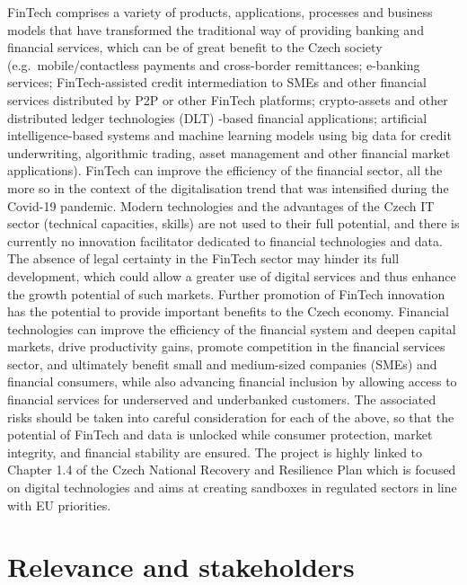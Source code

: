 \documentclass[
]{book}
\begin{document}
FinTech comprises a variety of products, applications, processes and business models that have transformed the traditional way of providing banking and financial services, which can be of great benefit to the Czech society (e.g.~mobile/contactless payments and cross-border remittances; e-banking services; FinTech-assisted credit intermediation to SMEs and other financial services distributed by P2P or other FinTech platforms; crypto-assets and other distributed ledger technologies (DLT) -based financial applications; artificial intelligence-based systems and machine learning models using big data for credit underwriting, algorithmic trading, asset management and other financial market applications).
FinTech can improve the efficiency of the financial sector, all the more so in the context of the digitalisation trend that was intensified during the Covid-19 pandemic. Modern technologies and the advantages of the Czech IT sector (technical capacities, skills) are not used to their full potential, and there is currently no innovation facilitator dedicated to financial technologies and data. The absence of legal certainty in the FinTech sector may hinder its full development, which could allow a greater use of digital services and thus enhance the growth potential of such markets.
Further promotion of FinTech innovation has the potential to provide important benefits to the Czech economy. Financial technologies can improve the efficiency of the financial system and deepen capital markets, drive productivity gains, promote competition in the financial services sector, and ultimately benefit small and medium-sized companies (SMEs) and financial consumers, while also advancing financial inclusion by allowing access to financial services for underserved and underbanked customers. The associated risks should be taken into careful consideration for each of the above, so that the potential of FinTech and data is unlocked while consumer protection, market integrity, and financial stability are ensured.
The project is highly linked to Chapter 1.4 of the Czech National Recovery and Resilience Plan which is focused on digital technologies and aims at creating sandboxes in regulated sectors in line with EU priorities.

\hypertarget{relevance-and-stakeholders}{%
\chapter{Relevance and stakeholders}\label{relevance-and-stakeholders}}
\end{document}
